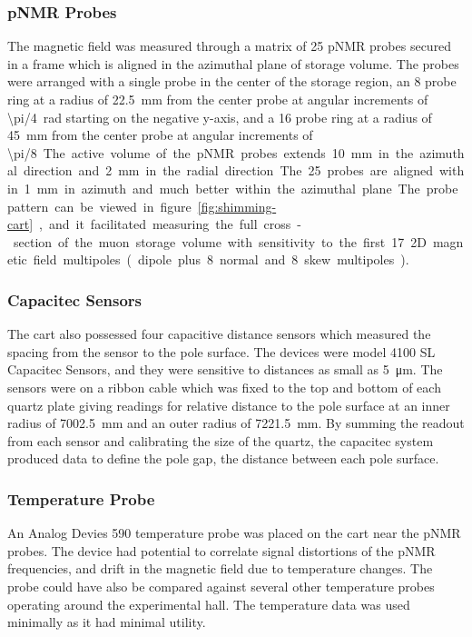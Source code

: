 \subsubsection{pNMR Probes}
The magnetic field was measured through a matrix of 25 pNMR probes secured in a frame which is aligned in the azimuthal plane of storage volume.  The probes were arranged with a single probe in the center of the storage region, an 8 probe ring at a radius of \SI{22.5}{\mm} from the center probe at angular increments of \SI{\pi/4}{\radian} starting on the negative y-axis, and a 16 probe ring at a radius of \SI{45}{\mm} from the center probe at angular increments of \SI{\pi/8}.  The active volume of the pNMR probes extends \SI{10}{\mm} in the azimuthal direction and \SI{2}{\mm} in the radial direction.  The 25 probes are aligned within \SI{1}{\mm} in azimuth and much better within the azimuthal plane.  The probe pattern can be viewed in figure \ref{fig:shimming-cart}, and it facilitated measuring the full cross-section of the muon storage volume with sensitivity to the first 17 2D magnetic field multipoles (dipole plus 8 normal and 8 skew multipoles).

\subsubsection{Capacitec Sensors}
The cart also possessed four capacitive distance sensors which measured the spacing from the sensor to the pole surface.  The devices were model 4100 SL Capacitec Sensors, and they were sensitive to distances as small as \SI{5}{\micro \meter}.   The sensors were on a ribbon cable which was fixed to the top and bottom of each quartz plate giving readings for relative distance to the pole surface at an inner radius of \SI{7002.5}{\mm} and an outer radius of \SI{7221.5}{\mm}.  By summing the readout from each sensor and calibrating the size of the quartz, the capacitec system produced data to define the pole gap, the distance between each pole surface.

\subsubsection{Temperature Probe}
An Analog Devies 590 temperature probe was placed on the cart near the pNMR probes. The device had potential to correlate signal distortions of the pNMR frequencies, and drift in the magnetic field due to temperature changes.  The probe could have also be compared against several other temperature probes operating around the experimental hall.  The temperature data was used minimally as it had minimal utility.

